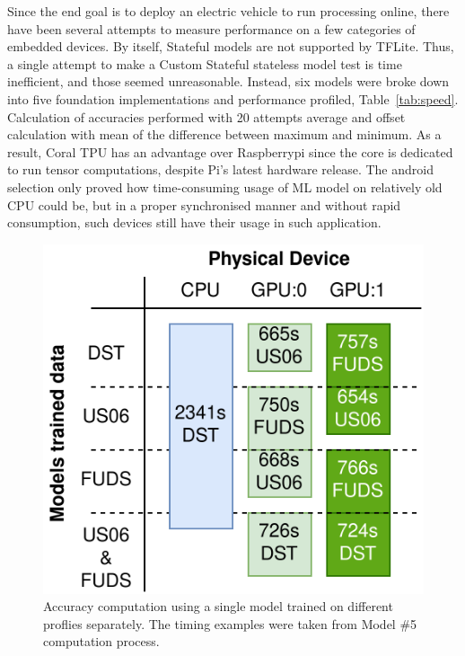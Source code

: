 %
%
Since the end goal is to deploy an electric vehicle to run processing online, there have been several attempts to measure performance on a few categories of embedded devices.
By itself, Stateful models are not supported by TFLite.
Thus, a single attempt to make a Custom Stateful stateless model test is time inefficient, and those seemed unreasonable.
Instead, six models were broke down into five foundation implementations and performance profiled, \mbox{Table~\ref{tab:speed}}.
Calculation of accuracies performed with 20 attempts average and offset calculation with mean of the difference between maximum and minimum.
As a result, Coral TPU has an advantage over Raspberrypi since the core is dedicated to run tensor computations, despite Pi's latest hardware release.
The android selection only proved how time-consuming usage of ML model on relatively old CPU could be, but in a proper synchronised manner and without rapid consumption, such devices still have their usage in such application.
\begin{figure}[ht]
    \centering
    \includegraphics[width=\columnwidth]{II_Body/images/Accuracy_Compute.png}
    \caption{Accuracy computation using a single model trained on different proflies separately. The timing examples were taken from Model \#5 computation process.}
    \label{fig:device_compute}
\end{figure}

